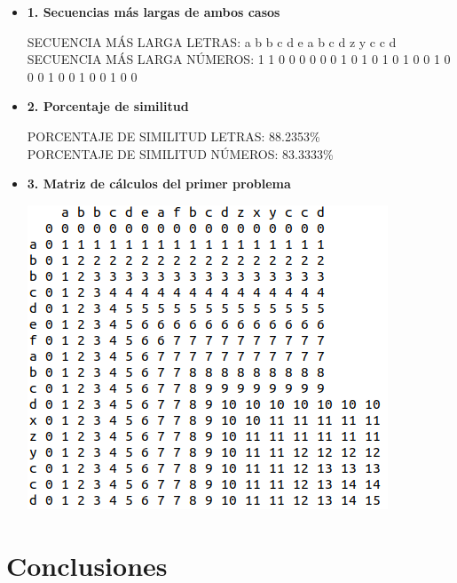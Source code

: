 \documentclass[10pt,a4paper]{article}
\begin{document}
\begin{itemize}
	\item \textbf{1. Secuencias más largas de ambos casos}
	
	\begin{center}
		SECUENCIA MÁS LARGA LETRAS: a b b c d e a b c d z y c c d
		\\
		SECUENCIA MÁS LARGA NÚMEROS: 1 1 0 0 0 0 0 0 1 0 1 0 1 0 1 0 0 1 0 0 0 1 0 0 1 0 0 1 0 0
	\end{center}

	\item \textbf{2. Porcentaje de similitud}
	
	\begin{center}
		PORCENTAJE DE SIMILITUD LETRAS: 88.2353\%
		\\
		PORCENTAJE DE SIMILITUD NÚMEROS: 83.3333\%
	\end{center}

	\item \textbf{3. Matriz de cálculos del primer problema}
	
	\begin{center}
		\includegraphics[scale=0.65]{./Matriz.png}
	\end{center}
	
\end{itemize}

\section{Conclusiones}
\end{document}
